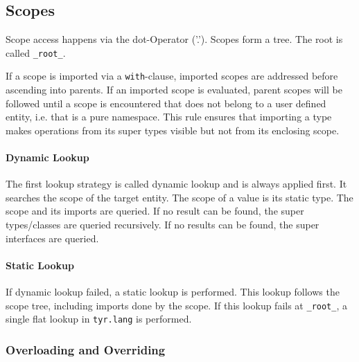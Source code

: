 \subsection{Scopes}

Scope access happens via the dot-Operator ('.').
Scopes form a tree.
The root is called \texttt{\_root\_}.

If a scope is imported via a \texttt{with}-clause, imported scopes are addressed before ascending into parents.
If an imported scope is evaluated, parent scopes will be followed until a scope is encountered that does not belong to a user defined entity, i.e. that is a pure namespace.
This rule ensures that importing a type makes operations from its super types visible but not from its enclosing scope.


\paragraph{Dynamic Lookup} The first lookup strategy is called dynamic lookup and is always applied first.
It searches the scope of the target entity.
The scope of a value is its static type.
The scope and its imports are queried.
If no result can be found, the super types/classes are queried recursively.
If no results can be found, the super interfaces are queried.


\paragraph{Static Lookup} If dynamic lookup failed, a static lookup is performed.
This lookup follows the scope tree, including imports done by the scope.
If this lookup fails at \texttt{\_root\_}, a single flat lookup in \texttt{tyr.lang} is performed.


\subsubsection{Overloading and Overriding}

